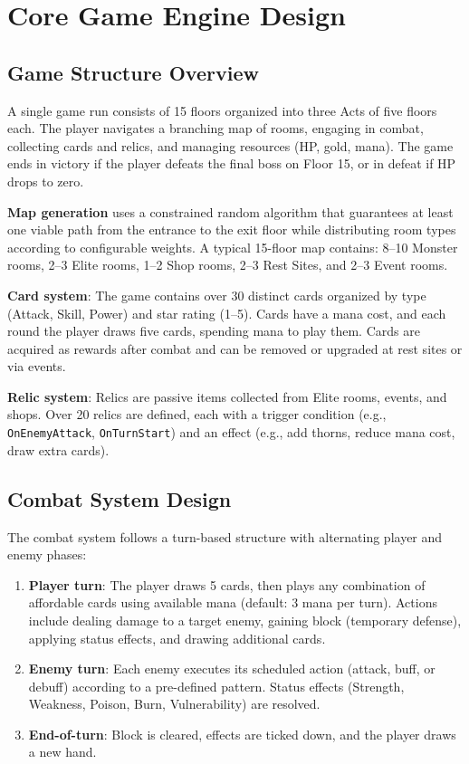 \section{Core Game Engine Design}

\subsection{Game Structure Overview}

A single game run consists of 15 floors organized into three Acts of five floors each. The player navigates a branching map of rooms, engaging in combat, collecting cards and relics, and managing resources (HP, gold, mana). The game ends in victory if the player defeats the final boss on Floor 15, or in defeat if HP drops to zero.

\textbf{Map generation} uses a constrained random algorithm that guarantees at least one viable path from the entrance to the exit floor while distributing room types according to configurable weights. A typical 15-floor map contains: 8--10 Monster rooms, 2--3 Elite rooms, 1--2 Shop rooms, 2--3 Rest Sites, and 2--3 Event rooms.

\textbf{Card system}: The game contains over 30 distinct cards organized by type (Attack, Skill, Power) and star rating (1--5). Cards have a mana cost, and each round the player draws five cards, spending mana to play them. Cards are acquired as rewards after combat and can be removed or upgraded at rest sites or via events.

\textbf{Relic system}: Relics are passive items collected from Elite rooms, events, and shops. Over 20 relics are defined, each with a trigger condition (e.g., \texttt{OnEnemyAttack}, \texttt{OnTurnStart}) and an effect (e.g., add thorns, reduce mana cost, draw extra cards).

\subsection{Combat System Design}

The combat system follows a turn-based structure with alternating player and enemy phases:

\begin{enumerate}
    \item \textbf{Player turn}: The player draws 5 cards, then plays any combination of affordable cards using available mana (default: 3 mana per turn). Actions include dealing damage to a target enemy, gaining block (temporary defense), applying status effects, and drawing additional cards.
    \item \textbf{Enemy turn}: Each enemy executes its scheduled action (attack, buff, or debuff) according to a pre-defined pattern. Status effects (Strength, Weakness, Poison, Burn, Vulnerability) are resolved.
    \item \textbf{End-of-turn}: Block is cleared, effects are ticked down, and the player draws a new hand.
\end{enumerate}

